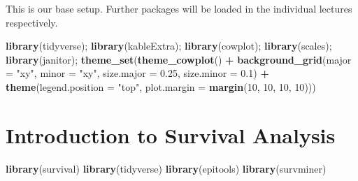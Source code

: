 \documentclass[
]{book}
\newenvironment{Shaded}{\begin{snugshade}}{\end{snugshade}}
\newcommand{\DataTypeTok}[1]{\textcolor[rgb]{0.13,0.29,0.53}{#1}}
\newcommand{\DecValTok}[1]{\textcolor[rgb]{0.00,0.00,0.81}{#1}}
\newcommand{\FloatTok}[1]{\textcolor[rgb]{0.00,0.00,0.81}{#1}}
\newcommand{\KeywordTok}[1]{\textcolor[rgb]{0.13,0.29,0.53}{\textbf{#1}}}
\newcommand{\NormalTok}[1]{#1}
\newcommand{\OperatorTok}[1]{\textcolor[rgb]{0.81,0.36,0.00}{\textbf{#1}}}
\newcommand{\StringTok}[1]{\textcolor[rgb]{0.31,0.60,0.02}{#1}}
\begin{document}
This is our base setup. Further packages will be loaded in the individual lectures respectively.

\begin{Shaded}
\begin{Highlighting}[]
\KeywordTok{library}\NormalTok{(tidyverse); }\KeywordTok{library}\NormalTok{(kableExtra); }\KeywordTok{library}\NormalTok{(cowplot); }\KeywordTok{library}\NormalTok{(scales); }\KeywordTok{library}\NormalTok{(janitor);}
\KeywordTok{theme\_set}\NormalTok{(}\KeywordTok{theme\_cowplot}\NormalTok{() }\OperatorTok{+}\StringTok{  }
\StringTok{              }\KeywordTok{background\_grid}\NormalTok{(}\DataTypeTok{major =} \StringTok{"xy"}\NormalTok{, }
                              \DataTypeTok{minor =} \StringTok{"xy"}\NormalTok{,}
                              \DataTypeTok{size.major =} \FloatTok{0.25}\NormalTok{,}
                              \DataTypeTok{size.minor =} \FloatTok{0.1}\NormalTok{) }\OperatorTok{+}
\StringTok{              }\KeywordTok{theme}\NormalTok{(}\DataTypeTok{legend.position =} \StringTok{"top"}\NormalTok{,}
                    \DataTypeTok{plot.margin =} \KeywordTok{margin}\NormalTok{(}\DecValTok{10}\NormalTok{, }\DecValTok{10}\NormalTok{, }\DecValTok{10}\NormalTok{, }\DecValTok{10}\NormalTok{)))}
\end{Highlighting}
\end{Shaded}

\hypertarget{introduction-to-survival-analysis}{%
\chapter{Introduction to Survival Analysis}\label{introduction-to-survival-analysis}}

\begin{Shaded}
\begin{Highlighting}[]
\KeywordTok{library}\NormalTok{(survival)}
\KeywordTok{library}\NormalTok{(tidyverse)}
\KeywordTok{library}\NormalTok{(epitools)}
\KeywordTok{library}\NormalTok{(survminer)}
\end{Highlighting}
\end{Shaded}
\end{document}
